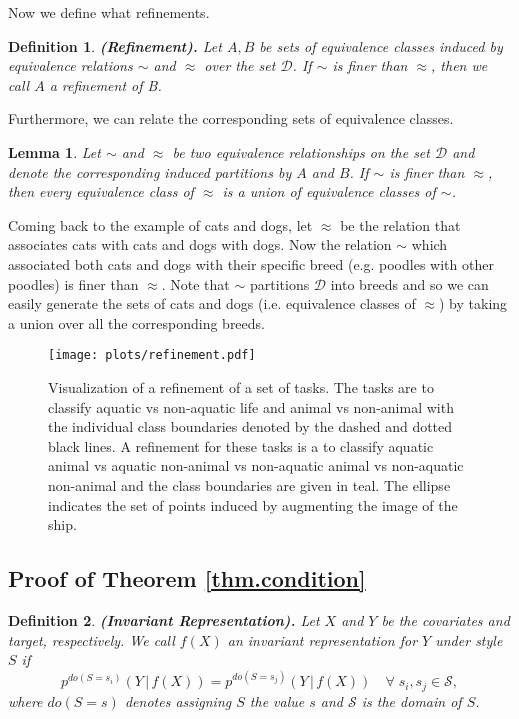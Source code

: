 \documentclass{article}
\newtheorem{lemma}{Lemma}
\newtheorem{definition}{Definition}
\begin{document}
Now we define what refinements.
\begin{definition}{\bf (Refinement).}
    Let $A, B$ be sets of equivalence classes induced by equivalence relations $\sim$ and $\approx$ over the set $\mathcal{D}$.
    If $\sim$ is finer than $\approx$, then we call $A$ a \textit{refinement} of B. 
\end{definition}


Furthermore, we can relate the corresponding sets of equivalence classes.
\begin{lemma}
    Let $\sim$ and $\approx$ be two equivalence relationships on the set $\mathcal{D}$ and denote the corresponding induced partitions by $A$ and $B$. If $\sim$ is finer than $\approx$, then every equivalence class of $\approx$ is a union of equivalence classes of $\sim$.
\end{lemma}
Coming back to the example of cats and dogs, let $\approx$ be the relation that associates cats with cats and dogs with dogs. Now the relation $\sim$ which associated both cats and dogs with their specific breed (e.g. poodles with other poodles) is finer than $\approx$. Note that $\sim$ partitions $\mathcal{D}$ into breeds and so we can easily generate the sets of cats and dogs (i.e. equivalence classes of $\approx$) by taking a union over all the corresponding breeds.

\begin{figure}
    \begin{center}
    \texttt{[image: plots/refinement.pdf]}
    \end{center}
    \caption{Visualization of a refinement of a set of tasks. The tasks are to classify aquatic vs non-aquatic life and animal vs non-animal with the individual class boundaries denoted by the dashed and dotted black lines. A refinement for these tasks is a to classify aquatic animal vs aquatic non-animal vs non-aquatic animal vs non-aquatic non-animal and the class boundaries are given in teal. The ellipse indicates the set of points induced by augmenting the image of the ship.}
    \label{fig:refinement}
\end{figure}

\subsection{Proof of Theorem \ref{thm.condition}}

\begin{definition}{\bf (Invariant Representation).}
Let $X$ and $Y$ be the covariates and target, respectively. We call $f(X)$ an invariant representation for $Y$ under style $S$ if
\begin{equation}
    p^{do(S = s_{i})}(Y\,\vert\,f(X)) = p^{do(S = s_{j})}(Y\,\vert\,f(X)) \quad \forall \; s_{i}, s_{j}\in\mathcal{S}, \label{app.eq.stability}
\end{equation}
where $do(S=s)$ denotes assigning $S$ the value $s$ and $\mathcal{S}$ is the domain of $S$.
\end{definition}
\end{document}
